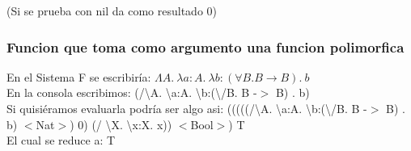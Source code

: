 \documentclass[12pt, titlepage, a4paper]{article}
\begin{document}
\noindent (Si se prueba con nil da como resultado 0)

\subsubsection{Funcion que toma como argumento una funcion polimorfica}
\noindent En el Sistema F se escribiría: $\Lambda A.\ \lambda a:A.\ \lambda b:(\forall B. B \rightarrow  B). \ b$ \\
En la consola escribimos: (/\textbackslash A. \textbackslash a:A. \textbackslash b:(\textbackslash /B. B -$>$ B) . b)\\
Si quisiéramos evaluarla podría ser algo asi: (((((/\textbackslash A. \textbackslash a:A. \textbackslash b:(\textbackslash /B. B -$>$ B) . b) $<$Nat$>$) 0) (/ \textbackslash X. \textbackslash x:X. x)) $<$Bool$>$) T\\
El cual se reduce a: T

\newpage



\end{document}
